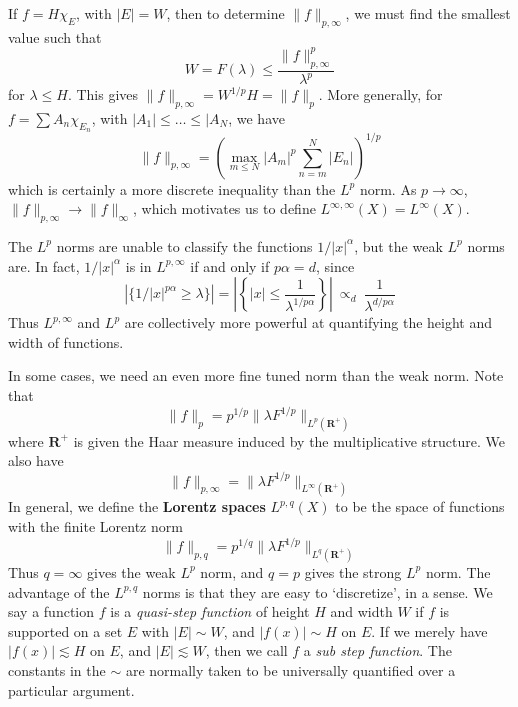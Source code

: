 \begin{example}
  If $f = H\chi_E$, with $|E| = W$, then to determine $\| f \|_{p,\infty}$, we must find the smallest value such that
  \[ W = F(\lambda) \leq \frac{\| f \|^p_{p,\infty}}{\lambda^p} \]
  for $\lambda \leq H$. This gives $\| f \|_{p,\infty} = W^{1/p}H = \| f \|_p$. More generally, for $f = \sum A_n \chi_{E_n}$, with $|A_1| \leq \dots \leq |A_N$, we have
  \[ \| f \|_{p,\infty} = \left( \max_{m \leq N} |A_m|^p \sum_{n = m}^N |E_n| \right)^{1/p} \]
  which is certainly a more discrete inequality than the $L^p$ norm. As $p \to \infty$, $\| f \|_{p,\infty} \to \| f \|_\infty$, which motivates us to define $L^{\infty,\infty}(X) = L^\infty(X)$.
\end{example}

\begin{example}
  The $L^p$ norms are unable to classify the functions $1/|x|^\alpha$, but the weak $L^p$ norms are. In fact, $1/|x|^\alpha$ is in $L^{p,\infty}$ if and only if $p \alpha = d$, since
  \[ \left| \{ 1/|x|^{p\alpha} \geq \lambda \} \right| = \left| \left\{ |x| \leq \frac{1}{\lambda^{1/p\alpha}} \right\} \right|\ \propto_d\ \frac{1}{\lambda^{d/p\alpha}} \]
  Thus $L^{p,\infty}$ and $L^p$ are collectively more powerful at quantifying the height and width of functions.
\end{example}

In some cases, we need an even more fine tuned norm than the weak norm. Note that
%
\[ \| f \|_p = p^{1/p} \| \lambda F^{1/p} \|_{L^p(\mathbf{R}^+)} \]
%
where $\mathbf{R}^+$ is given the Haar measure induced by the multiplicative structure. We also have
%
\[ \| f \|_{p,\infty} = \| \lambda F^{1/p} \|_{L^\infty(\mathbf{R}^+)} \]
%
In general, we define the {\bf Lorentz spaces} $L^{p,q}(X)$ to be the space of functions with the finite Lorentz norm
%
\[ \| f \|_{p,q} = p^{1/q} \| \lambda F^{1/p} \|_{L^q(\mathbf{R}^+)} \]
%
Thus $q = \infty$ gives the weak $L^p$ norm, and $q = p$ gives the strong $L^p$ norm. The advantage of the $L^{p,q}$ norms is that they are easy to `discretize', in a sense. We say a function $f$ is a {\it quasi-step function} of height $H$ and width $W$ if $f$ is supported on a set $E$ with $|E| \sim W$, and $|f(x)| \sim H$ on $E$. If we merely have $|f(x)| \lesssim H$ on $E$, and $|E| \lesssim W$, then we call $f$ a {\it sub step function}. The constants in the $\sim$ are normally taken to be universally quantified over a particular argument.

